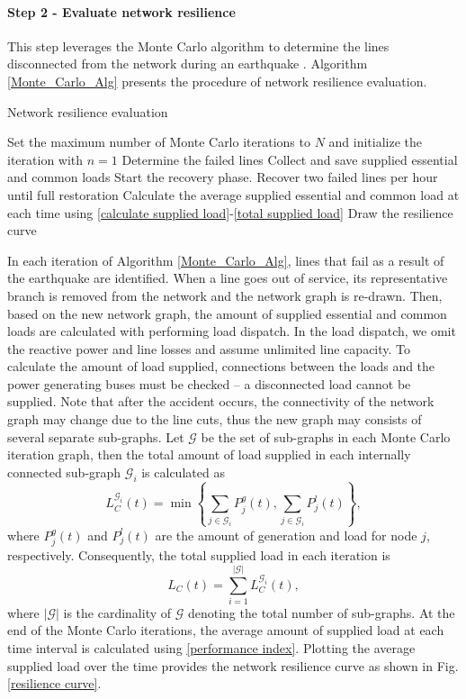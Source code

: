 \documentclass[conference]{IEEEtran}
\begin{document}
\paragraph{Step 2 - Evaluate network resilience}\label{p2s2}
This step leverages the Monte Carlo algorithm \cite{Reiter_MonteCarlo_2007} to determine the lines disconnected from the network during an earthquake \cite{panteli_2017}. Algorithm \ref{Monte_Carlo_Alg} presents the procedure of network resilience evaluation. \begin{algorithm} 
\caption{Network resilience evaluation}\label{Steps for evaluation of the network resilience.}
\begin{algorithmic}[1]
\State Set the maximum number of Monte Carlo iterations to $N$ and initialize the iteration with $n=1$
\State Determine the failed lines
\State Collect and save supplied essential and common loads
\State Start the recovery phase. Recover two failed lines per hour until full restoration
\EndWhile
\State Calculate the average supplied essential and common load at each time using \eqref{calculate supplied load}-\eqref{total supplied load} 
\State Draw the resilience curve
\end{algorithmic}
\label{Monte_Carlo_Alg}
\end{algorithm} In each iteration of Algorithm \ref{Monte_Carlo_Alg}, lines that fail as a result of the earthquake are identified. When a line goes out of service, its representative branch is removed from the network and the network graph is re-drawn. Then, based on the new network graph, the amount of supplied essential and common loads are calculated with performing load dispatch. In the load dispatch, we omit the reactive power and line losses and assume unlimited line capacity. To calculate the amount of load supplied, connections between the loads and the power generating buses must be checked -- a disconnected load cannot be supplied. Note that after the accident occurs, the connectivity of the network graph may change due to the line cuts, thus the new graph may consists of several separate sub-graphs. Let $\mathcal{G}$ be the set of sub-graphs in each Monte Carlo iteration graph, then the total amount of load supplied in each internally connected sub-graph $\mathcal{G}_i$ is calculated as
 \begin{equation} \label{calculate supplied load}
    L_C^{\mathcal{G}_i}(t)=\min\left\{ \sum_{j\in \mathcal{G}_i}P^g_j(t), \sum_{j\in \mathcal{G}_i}P^l_j(t) \right\},
\end{equation}
where $P_j^g(t)$ and $P_j^l(t)$ are the amount of generation and load for node $j$, respectively. Consequently, the total supplied load in each iteration is
\begin{equation}\label{total supplied load}
    L_C(t)=\sum_{i=1}^{|\mathcal{G}|}L_C^{\mathcal{G}_i}(t),
\end{equation}
where $|\mathcal{G}|$ is the cardinality of $\mathcal{G}$ denoting the total number of sub-graphs. At the end of the Monte Carlo iterations, the average amount of supplied load at each time interval is calculated using \eqref{performance index}. Plotting the average supplied load over the time provides the network resilience curve as shown in Fig. \ref{resilience curve}.
\end{document}
